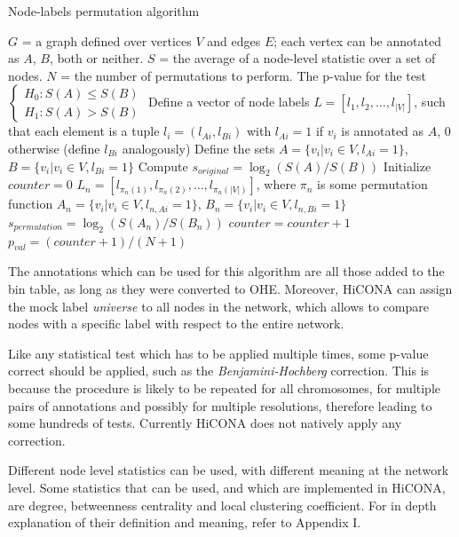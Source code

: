 \begin{algorithm}
\caption{Node-labels permutation algorithm}\label{alg:labelPermutations}
\begin{algorithmic}[1]
\Require $G$ = a graph defined over vertices $V$ and edges $E$; each vertex can be annotated as $A$, $B$, both or neither. $S$ = the average of a node-level statistic over a set of nodes. $N$ = the number of permutations to perform.
\Ensure The p-value for the test $\begin{cases} H_0: S(A) \leq S(B) \\ H_1: S(A) > S(B) \end{cases}$
\State Define a vector of node labels $L = \left[l_1, l_2, \dots, l_{|V|}\right]$, such that each element is a tuple $l_i = (l_{Ai}, l_{Bi})$ with $l_{Ai} = 1$ if $v_i$ is annotated as $A$, 0 otherwise (define $l_{Bi}$ analogously)
\State Define the sets $A = \{v_i | v_i \in V, l_{Ai} = 1\}$, $B = \{v_i | v_i \in V, l_{Bi} = 1\}$
\State Compute $s_{original} = \log_2(S(A)/S(B))$
\State Initialize $counter = 0$ 
    \State $L_n = [l_{\pi_n(1)}, l_{\pi_n(2)}, \dots, l_{\pi_n(|V|)}]$, where $\pi_n$ is some permutation function
    \State $A_n = \{v_i | v_i \in V, l_{n, Ai}=1\}$, $B_n = \{v_i | v_i \in V, l_{n, Bi}=1\}$
    \State $s_{permutation} = \log_2(S(A_n)/S(B_n))$
        \State $counter = counter + 1$
    \EndIf
\EndFor
\State $p_{val} = (counter + 1) / (N + 1)$
\end{algorithmic}
\end{algorithm}

The annotations which can be used for this algorithm are all those added to the bin table, as long as they were converted to OHE. Moreover, HiCONA can assign the mock label \emph{universe} to all nodes in the network, which allows to compare nodes with a specific label with respect to the entire network.

Like any statistical test which has to be applied multiple times, some p-value correct should be applied, such as the \emph{Benjamini-Hochberg} correction. This is because the procedure is likely to be repeated for all chromosomes, for multiple pairs of annotations and possibly for multiple resolutions, therefore leading to some hundreds of tests. Currently HiCONA does not natively apply any correction.

Different node level statistics can be used, with different meaning at the network level. Some statistics that can be used, and which are implemented in HiCONA, are degree, betweenness centrality and local clustering coefficient. For in depth explanation of their definition and meaning, refer to Appendix I.


